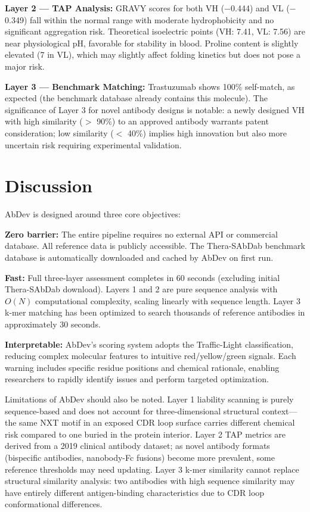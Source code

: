 \documentclass[12pt,a4paper]{article}
\begin{document}
\textbf{Layer 2 --- TAP Analysis:} GRAVY scores for both VH ($-$0.444) and VL ($-$0.349) fall within the normal range with moderate hydrophobicity and no significant aggregation risk. Theoretical isoelectric points (VH: 7.41, VL: 7.56) are near physiological pH, favorable for stability in blood. Proline content is slightly elevated (7 in VL), which may slightly affect folding kinetics but does not pose a major risk.

\textbf{Layer 3 --- Benchmark Matching:} Trastuzumab shows 100\% self-match, as expected (the benchmark database already contains this molecule). The significance of Layer 3 for novel antibody designs is notable: a newly designed VH with high similarity ($>$ 90\%) to an approved antibody warrants patent consideration; low similarity ($<$ 40\%) implies high innovation but also more uncertain risk requiring experimental validation.

\section{Discussion}

AbDev is designed around three core objectives:

\textbf{Zero barrier:} The entire pipeline requires no external API or commercial database. All reference data is publicly accessible. The Thera-SAbDab benchmark database is automatically downloaded and cached by AbDev on first run.

\textbf{Fast:} Full three-layer assessment completes in 60 seconds (excluding initial Thera-SAbDab download). Layers 1 and 2 are pure sequence analysis with $O(N)$ computational complexity, scaling linearly with sequence length. Layer 3 k-mer matching has been optimized to search thousands of reference antibodies in approximately 30 seconds.

\textbf{Interpretable:} AbDev's scoring system adopts the Traffic-Light classification, reducing complex molecular features to intuitive red/yellow/green signals. Each warning includes specific residue positions and chemical rationale, enabling researchers to rapidly identify issues and perform targeted optimization.

Limitations of AbDev should also be noted. Layer 1 liability scanning is purely sequence-based and does not account for three-dimensional structural context---the same NXT motif in an exposed CDR loop surface carries different chemical risk compared to one buried in the protein interior. Layer 2 TAP metrics are derived from a 2019 clinical antibody dataset; as novel antibody formats (bispecific antibodies, nanobody-Fc fusions) become more prevalent, some reference thresholds may need updating. Layer 3 k-mer similarity cannot replace structural similarity analysis: two antibodies with high sequence similarity may have entirely different antigen-binding characteristics due to CDR loop conformational differences.
\end{document}
